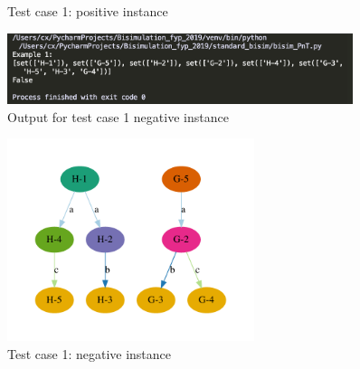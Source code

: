 \begin{figure}[H]
    \centering
    \caption{Test case 1: positive instance}
    \label{fig:output1g}
\end{figure}

\begin{figure}[H]
\centering
\includegraphics[width=0.9\textwidth]{img/output1-.png}
\caption{Output for test case 1 negative instance}
\label{fig:output1-}
\end{figure}

\begin{figure}[H]
    \centering
    \includegraphics[height=16em]{img/output1g-.pdf}
    \caption{Test case 1: negative instance}
    \label{fig:output1g-}
\end{figure}

